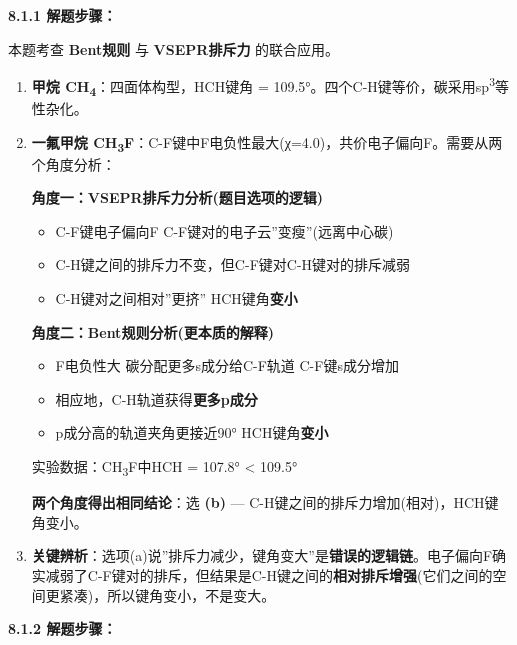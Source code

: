\textbf{8.1.1 解题步骤：}

本题考查 \textbf{Bent规则} 与 \textbf{VSEPR排斥力} 的联合应用。

\begin{enumerate}
\def\labelenumi{\arabic{enumi}.}
\item
  \textbf{甲烷 CH\textsubscript{4}}：四面体构型，HCH键角 = 109.5°。四个C-H键等价，碳采用sp\textsuperscript{3}等性杂化。
\item
  \textbf{一氟甲烷 CH\textsubscript{3}F}：C-F键中F电负性最大(χ=4.0)，共价电子偏向F。需要从两个角度分析：

  \textbf{角度一：VSEPR排斥力分析(题目选项的逻辑)}

  \begin{itemize}
  \tightlist
  \item
    C-F键电子偏向F \箭 C-F键对的电子云''变瘦''(远离中心碳)
  \item
    C-H键之间的排斥力不变，但C-F键对C-H键对的排斥减弱
  \item
    C-H键对之间相对''更挤'' \箭 HCH键角\textbf{变小}
  \end{itemize}

  \textbf{角度二：Bent规则分析(更本质的解释)}

  \begin{itemize}
  \tightlist
  \item
    F电负性大 \箭 碳分配更多s成分给C-F轨道 \箭 C-F键s成分增加
  \item
    相应地，C-H轨道获得\textbf{更多p成分}
  \item
    p成分高的轨道夹角更接近90° \箭 HCH键角\textbf{变小}
  \end{itemize}

  实验数据：CH\textsubscript{3}F中HCH = 107.8° \textless{} 109.5°

  \textbf{两个角度得出相同结论}：选 \textbf{(b)} --- C-H键之间的排斥力增加(相对)，HCH键角变小。
\item
  \textbf{关键辨析}：选项(a)说''排斥力减少，键角变大''是\textbf{错误的逻辑链}。电子偏向F确实减弱了C-F键对的排斥，但结果是C-H键之间的\textbf{相对排斥增强}(它们之间的空间更紧凑)，所以键角变小，不是变大。
\end{enumerate}

\textbf{8.1.2 解题步骤：}


